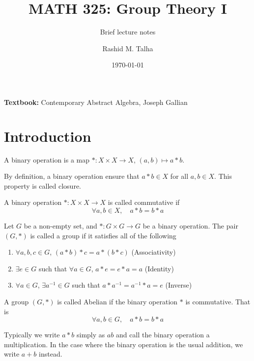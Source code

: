 \documentclass[11pt]{penrose}
\title{MATH 325: Group Theory I}
\subtitle{Brief lecture notes}
\author{Rashid M. Talha}
\affiliation{School of Natural Sciences, NUST}
\date{\today}
\begin{document}
\maketitle

\textbf{Textbook:} Contemporary Abstract Algebra, Joseph Gallian

\section{Introduction}
\begin{ndfn}
    A binary operation is a map $* : X \times X \to X$, $(a,b) \mapsto a * b$.
\end{ndfn}

By definition, a binary operation ensure that $a * b \in X$ for all $a, b \in X$. This property is called closure.

\begin{ndfn}
    A binary operation $* : X \times X \to X$ is called commutative if
    \begin{equation*}
        \forall a, b \in X, \quad a * b = b * a
    \end{equation*}
\end{ndfn}

\begin{ndfn}
    Let $G$ be a non-empty set, and $* : G \times G \to G$ be a binary operation. The pair $(G, *)$ is called a group if it satisfies all of the following
    \begin{enumerate}
        \item $\forall a, b, c \in G$, $(a * b) * c = a * (b * c)$ \hfill(Associativity)
        \item $\exists e \in G$ such that $\forall a \in G$, $a * e = e * a = a$ \hfill(Identity)
        \item $\forall a \in G$, $\exists a^{-1} \in G$ such that $a * a^{-1} = a^{-1} * a = e$ \hfill(Inverse)
    \end{enumerate}
\end{ndfn}

\begin{ndfn}
    A group $(G, *)$ is called Abelian if the binary operation $*$ is commutative. That is
    \begin{equation*}
        \forall a, b \in G, \quad a * b = b * a
    \end{equation*}
\end{ndfn}

Typically we write $a * b$ simply as $ab$ and call the binary operation a multiplication. In the case where the binary operation is the usual addition, we write $a + b$ instead.
\end{document}
